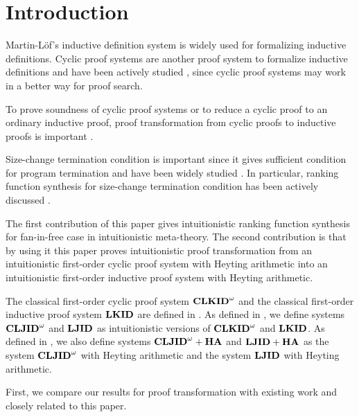 \section{Introduction}

Martin-L\"of's inductive definition system \cite{Martin-Lof-1971} is
widely used for formalizing inductive definitions.
Cyclic proof systems \cite{Brotherston06,Brotherston11} are another proof system to formalize
inductive definitions and have been actively 
studied \cite{berardi17,Berardi17a,Berardi18,berardi19,Brotherston06,brotherston07,brotherston08,brotherston11b,Brotherston11,brotherston12,brotherston25,rowe20,rowe24,rowe25,das23a,das26,das20,das21,das22,das23,Ikebuchi25,rowe21,oda25,brotherston17b,brotherston17a,brotherston17},
since cyclic proof systems may work in a better way for proof search.

To prove soundness of cyclic proof systems or
to reduce a cyclic proof to an ordinary inductive proof,
proof transformation from cyclic proofs to inductive proofs is 
important \cite{berardi17,Berardi17a,Berardi18,berardi19,Brotherston06,Brotherston11}.

Size-change termination condition \cite{Lee-Jones01} is important since it gives
sufficient condition for program termination
and have been widely studied \cite{Avery06,Benamram09,Benamram10,Heizmann-Jones10,Ikebuchi25,Lee09}.
In particular, ranking function synthesis for size-change termination condition has been actively discussed \cite{Benamram09,Benamram10,Lee09}.

The first contribution of this paper gives intuitionistic ranking function synthesis
for fan-in-free case in intuitionistic meta-theory.
The second contribution is that
by using it
this paper proves intuitionistic proof transformation
from an intuitionistic first-order cyclic proof system with Heyting arithmetic
into an intuitionistic first-order inductive proof system with Heyting arithmetic.

The classical first-order cyclic proof system ${{\bf CLKID}^\omega}$ and 
the classical first-order inductive proof system ${\bf LKID}$ are defined 
in \cite{Brotherston11}.
As defined in \cite{Berardi18},
we define systems ${{\bf CLJID}^\omega}$ and ${\bf LJID}$ 
as intuitionistic versions of ${{\bf CLKID}^\omega}$ and ${\bf LKID}$.
As defined in \cite{Berardi18},
we also define systems ${{\bf CLJID}^\omega+{\bf HA}}$ and ${{\bf LJID}+{\bf HA}}$ as
the system ${{\bf CLJID}^\omega}$ with Heyting arithmetic
and the system ${\bf LJID}$ with Heyting arithmetic.

First, we compare our results for proof transformation
with existing work \cite{Berardi18} and
\cite{Ikebuchi25} closely related to this paper.

